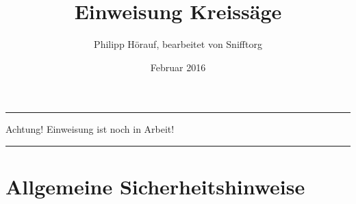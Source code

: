 \documentclass{\basedir/fablab-document}
\date{Februar 2016}
\author{Philipp Hörauf, bearbeitet von Snifftorg}
\title{Einweisung Kreissäge}
\begin{document}
\dosecttoc
\faketableofcontents
{}

\color{red}
\hrule
\begin{center}
\large{Achtung! Einweisung ist noch in Arbeit!}
\vspace{0.1cm}
\end{center}
\hrule
\color{black}

\section[Allgemeine Sicherheitshinweise]{Allgemeine Sicherheitshinweise}
\end{document}
